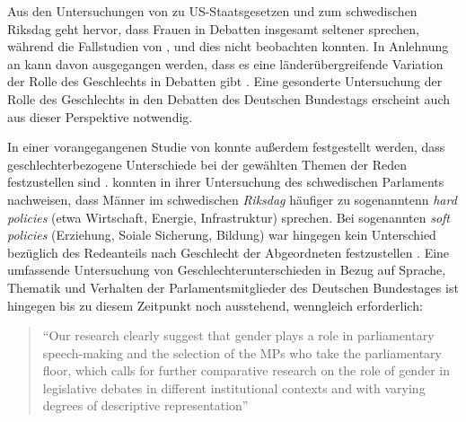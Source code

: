 \documentclass[12pt, 
    twoside=false, 
    bibliography=totoc, 
    numbers=endperiod, 
    headings=normal, 
    toc=chapterentrydotfill
    ]{scrbook}
\begin{document}
Aus den Untersuchungen von \textcite{kathlene_1994} zu US-Staatsgesetzen und \textcite{back_2014} zum schwedischen Riksdag geht hervor, dass Frauen in Debatten insgesamt seltener sprechen, während die Fallstudien von \textcite{broughton_1999}, \textcite{murray_2010} und \textcite{wang_2014} dies nicht beobachten konnten. In Anlehnung an \textcite{back_2018} kann davon ausgegangen werden, dass es eine länderübergreifende Variation der Rolle des Geschlechts in Debatten gibt \parencite[2]{back_2018}. Eine gesonderte Untersuchung der Rolle des Geschlechts in den Debatten des Deutschen Bundestags erscheint auch aus dieser Perspektive notwendig. 

In einer vorangegangenen Studie von \textcite{back_2014} konnte außerdem festgestellt werden, dass geschlechterbezogene Unterschiede bei der gewählten Themen der Reden festzustellen sind \parencite[514f.]{back_2014}. \textcite{back_2014} konnten in ihrer Untersuchung des schwedischen Parlaments nachweisen, dass Männer im schwedischen \emph{Riksdag} häufiger zu sogenanntenn \emph{hard policies} (etwa Wirtschaft, Energie, Infrastruktur) sprechen. Bei sogenannten \emph{soft policies} (Erziehung, Soiale Sicherung, Bildung) war hingegen kein Unterschied bezüglich des Redeanteils nach Geschlecht der Abgeordneten festzustellen \parencite[514f.]{back_2014}. Eine umfassende Untersuchung von Geschlechterunterschieden in Bezug auf Sprache, Thematik und Verhalten der Parlamentsmitglieder des Deutschen Bundestages ist hingegen bis zu diesem Zeitpunkt noch ausstehend, wenngleich erforderlich: 

\citereset
\begin{quote}
 \enquote{Our research clearly suggest that gender plays a role in parliamentary speech-making and the selection of the MPs who take the parliamentary floor, which calls for further comparative research on the role of gender in legislative debates in different institutional contexts and with varying degrees of descriptive representation}
  \parencite[515]{back_2014}
\end{quote}

\end{document}
